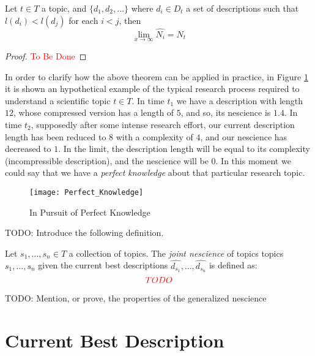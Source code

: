 \begin{theorem}
Let $t\in T$ a topic, and $\{d_1, d_2, \ldots \}$ where $d_i \in D_t$ a set of descriptions such that $ l(d_i) < l(d_j)$ for each $i < j$, then
\[
\lim_{x \to \infty} \hat{N_i} = N_t
\]
\end{theorem}
\begin{proof}
\textcolor{red}{To Be Done}
\end{proof}

\begin{example}
In order to clarify how the above theorem can be applied in practice, in Figure \ref{fig:Perfect_Knowledge} it is shown an hypothetical example of the typical research process required to understand a scientific topic $t\in T$. In time $t_{1}$ we have a description with length $12$, whose compressed version has a length of $5$, and so, its nescience is $1.4$. In time $t_{2}$, supposedly after some intense research effort, our current description length has been reduced to $8$ with a complexity of $4$, and our nescience has decreased to $1$. In the limit, the description length will be equal to its complexity (incompressible description), and the nescience will be 0. In this moment we could say that we have a \emph{perfect knowledge} about that particular research topic.
\end{example}

\begin{figure}[h]
\centering\texttt{[image: Perfect\_Knowledge]}
\caption{\label{fig:Perfect_Knowledge}In Pursuit of Perfect Knowledge}
\end{figure}

{\color{red} TODO: Introduce the following definition.}

\begin{definition}
Let $s_{1}, \ldots, s_{n} \in T$ a collection of topics. The \emph{joint nescience} of topics topics $s_{1}, \ldots, s_{n}$ given the current best descriptions $\hat{d_{s_1}}, \ldots, \hat{d_{s_n}}$ is defined as: 
\[
{\color{red} TODO}
\]
\end{definition}

{\color{red} TODO: Mention, or prove, the properties of the generalized nescience}

%
%

\section{Current Best Description}

